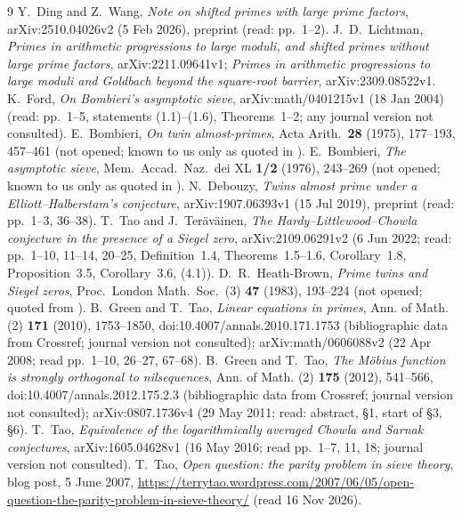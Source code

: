 \documentclass[11pt]{amsart}
\theoremstyle{definition}
\theoremstyle{remark}
\begin{document}
\begin{thebibliography}{9}
 Y.~Ding and Z.~Wang, \emph{Note on shifted primes with large prime factors}, arXiv:2510.04026v2 (5 Feb 2026), preprint (read: pp.~1--2).
 J.~D.~Lichtman, \emph{Primes in arithmetic progressions to large
  moduli, and shifted primes without large prime factors}, arXiv:2211.09641v1;
  \emph{Primes in arithmetic progressions to large moduli and Goldbach beyond the
  square-root barrier}, arXiv:2309.08522v1.
 K.~Ford, \emph{On Bombieri's asymptotic sieve}, arXiv:math/0401215v1
  (18 Jan 2004) (read: pp.~1--5, statements (1.1)--(1.6), Theorems~1--2; any journal
  version not consulted).
 E.~Bombieri, \emph{On twin almost-primes}, Acta Arith.\
  \textbf{28} (1975), 177--193, 457--461 (not opened; known to us only as
  quoted in \cite{Fo04}).
 E.~Bombieri, \emph{The asymptotic sieve}, Mem.\ Accad.\ Naz.\ dei
  XL \textbf{1/2} (1976), 243--269 (not opened; known to us only as quoted in
  \cite{Fo04}).
 N.~Debouzy, \emph{Twins almost prime under a
  Elliott--Halberstam's conjecture}, arXiv:1907.06393v1 (15 Jul 2019), preprint
  (read: pp.~1--3, 36--38).
 T.~Tao and J.~Ter\"av\"ainen, \emph{The Hardy--Littlewood--Chowla
  conjecture in the presence of a Siegel zero}, arXiv:2109.06291v2 (6 Jun 2022;
  read: pp.~1--10, 11--14, 20--25, Definition~1.4, Theorems~1.5--1.6,
  Corollary~1.8, Proposition~3.5, Corollary~3.6, (4.1)).
 D.~R.~Heath-Brown, \emph{Prime twins and Siegel zeros}, Proc.\
  London Math.\ Soc.\ (3) \textbf{47} (1983), 193--224 (not opened; quoted
  from \cite[Theorem~1.5(i)]{TT22}).
\bibitem{GT10} B.~Green and T.~Tao, \emph{Linear equations in primes}, Ann. of Math. (2) \textbf{171} (2010), 1753--1850, doi:10.4007/annals.2010.171.1753 (bibliographic data from Crossref; journal version not consulted); arXiv:math/0606088v2 (22 Apr 2008; read pp.~1--10, 26--27, 67--68).
\bibitem{GT12} B.~Green and T.~Tao, \emph{The M\"obius function is strongly orthogonal to nilsequences}, Ann. of Math. (2) \textbf{175} (2012), 541--566, doi:10.4007/annals.2012.175.2.3 (bibliographic data from Crossref; journal version not consulted); arXiv:0807.1736v4 (29 May 2011; read: abstract, \S1, start of \S3, \S6).
\bibitem{Tao16b} T.~Tao, \emph{Equivalence of the logarithmically averaged Chowla and Sarnak conjectures}, arXiv:1605.04628v1 (16 May 2016; read pp.~1--7, 11, 18; journal version not consulted).
\bibitem{Tao07} T.~Tao, \emph{Open question: the parity problem in sieve theory}, blog post, 5 June 2007, \url{https://terrytao.wordpress.com/2007/06/05/open-question-the-parity-problem-in-sieve-theory/} (read 16 Nov 2026).

\end{thebibliography}
\end{document}
